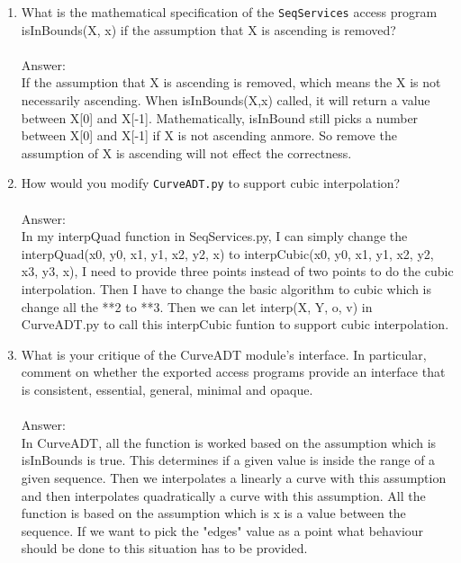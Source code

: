 \documentclass[12pt]{article}
\begin{document}
\begin{enumerate}

\item What is the mathematical specification of the \texttt{SeqServices} access
  program isInBounds(X, x) if the assumption that X is ascending is removed?\\
  \\
Answer:\\
If the assumption that X is ascending is removed, which means the X is not necessarily ascending. When isInBounds(X,x) called, it will return a value between X[0] and X[-1]. Mathematically, isInBound still picks a number between X[0] and X[-1] if X is not ascending anmore. So remove the assumption of X is ascending will not effect the correctness.  

\item How would you modify \texttt{CurveADT.py} to support cubic interpolation?\\
  \\
Answer:\\
In my interpQuad function in SeqServices.py, I can simply change the interpQuad(x0, y0, x1, y1, x2, y2, x) to interpCubic(x0, y0, x1, y1, x2, y2, x3, y3, x), I need to provide three points instead of two points to do the cubic interpolation. Then I have to change the basic algorithm to cubic which is change all the **2 to **3. Then we can let interp(X, Y, o, v) in CurveADT.py to call this interpCubic funtion to support cubic interpolation. 

\item What is your critique of the CurveADT module's interface.  In particular,
  comment on whether the exported access programs provide an interface that is
  consistent, essential, general, minimal and opaque.\\
  \\
Answer:\\
In CurveADT, all the function is worked based on the assumption which is isInBounds is true. This determines if a given value is inside the range of a given sequence. Then we interpolates a linearly a curve with this assumption and then interpolates quadratically a curve with this assumption. All the function is based on the assumption which is x is a value between the sequence. If we want to pick the "edges" value as a point what behaviour should be done to this situation has to be provided. 


\end{enumerate}
\end{document}
